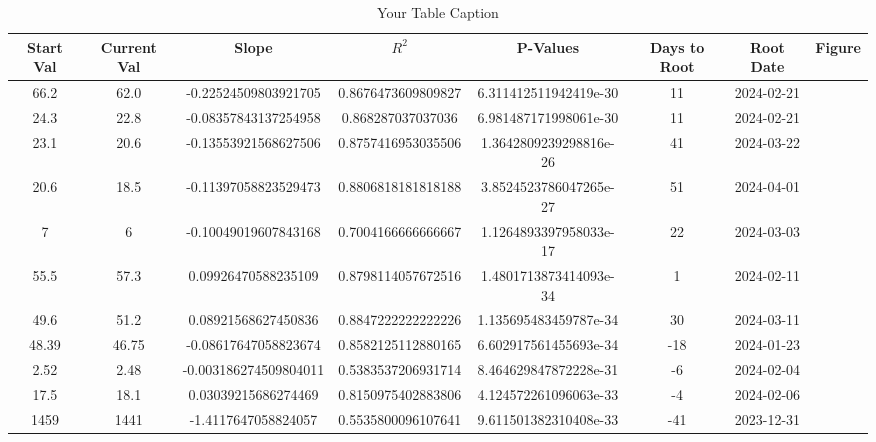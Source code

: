 \documentclass{article}
\begin{document}
        \begin{table}
        \centering
        \begin{tabular}{@{}cccccccc@{}}
        \toprule
        Start Val & Current Val & Slope & $R^2$ & P-Values & Days to Root & Root Date & Figure \\
        \midrule
        66.2 & 62.0 & -0.22524509803921705 & 0.8676473609809827 & 6.311412511942419e-30 & 11 & 2024-02-21 \\
24.3 & 22.8 & -0.08357843137254958 & 0.868287037037036 & 6.981487171998061e-30 & 11 & 2024-02-21 \\
23.1 & 20.6 & -0.13553921568627506 & 0.8757416953035506 & 1.3642809239298816e-26 & 41 & 2024-03-22 \\
20.6 & 18.5 & -0.11397058823529473 & 0.8806818181818188 & 3.8524523786047265e-27 & 51 & 2024-04-01 \\
7 & 6 & -0.10049019607843168 & 0.7004166666666667 & 1.1264893397958033e-17 & 22 & 2024-03-03 \\
55.5 & 57.3 & 0.09926470588235109 & 0.8798114057672516 & 1.4801713873414093e-34 & 1 & 2024-02-11 \\
49.6 & 51.2 & 0.08921568627450836 & 0.8847222222222226 & 1.135695483459787e-34 & 30 & 2024-03-11 \\
48.39 & 46.75 & -0.08617647058823674 & 0.8582125112880165 & 6.602917561455693e-34 & -18 & 2024-01-23 \\
2.52 & 2.48 & -0.003186274509804011 & 0.5383537206931714 & 8.464629847872228e-31 & -6 & 2024-02-04 \\
17.5 & 18.1 & 0.03039215686274469 & 0.8150975402883806 & 4.124572261096063e-33 & -4 & 2024-02-06 \\
1459 & 1441 & -1.4117647058824057 & 0.5535800096107641 & 9.611501382310408e-33 & -41 & 2023-12-31 \\
\bottomrule
        \end{tabular}
        \caption{Your Table Caption}
        \end{table}
        
\end{document}
